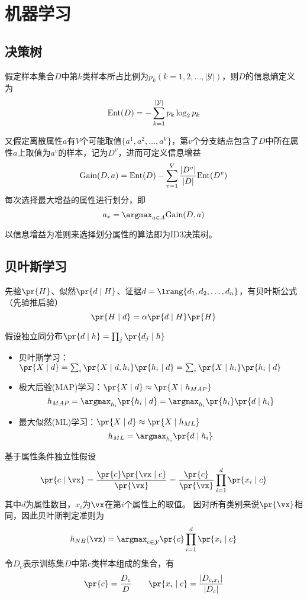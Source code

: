 
\section{机器学习}

\subsection{决策树}
假定样本集合$D$中第$k$类样本所占比例为$p_k(k=1,2,\ldots,|\mathcal{Y}|)$，则$D$的信息熵定义为
\[\mathrm{Ent}(D)=-\sum_{k=1}^{|\mathcal{Y}|}p_k\log_2 p_k\]

又假定离散属性$a$有$V$个可能取值$\{a^1,a^2,\ldots,a^V\}$，第$v$个分支结点包含了$D$中所在属性$a$上取值为$a^v$的样本，记为$D^v$，进而可定义信息增益
\[\mathrm{Gain}(D,a)=\mathrm{Ent}(D)-\sum_{v=1}^V\frac{|D^v|}{|D|}\mathrm{Ent}(D^v)\]
每次选择最大增益的属性进行划分，即
\[a_*=\argmax_{a\in A}\mathrm{Gain}(D,a)\]

以信息增益为准则来选择划分属性的算法即为ID3决策树。

\subsection{贝叶斯学习}
先验$\pr{H}$、似然$\pr{d\mid H}$、证据$d=\lrang{d_1,d_2,\ldots,d_n}$，有贝叶斯公式（先验推后验）
\[\pr{H\mid d}=\alpha\pr{d\mid H}\pr{H}\]

假设独立同分布$\pr{d\mid h}=\prod_j\pr{d_j\mid h}$
\begin{itemize}
	\item 贝叶斯学习：$\pr{X\mid d}=\sum_i\pr{X\mid d,h_i}\pr{h_i\mid d}=\sum_i\pr{X\mid h_i}\pr{h_i\mid d}$
	\item 极大后验(MAP)学习：$\pr{X\mid d}\approx\pr{X\mid h_{MAP}}$
	\[h_{MAP}=\argmax_{h_i}\pr{h_i\mid d}=\argmax_{h_i}\pr{h_i}\pr{d\mid h_i}\]
	\item 最大似然(ML)学习：$\pr{X\mid d}\approx\pr{X\mid h_{ML}}$
	\[h_{ML}=\argmax_{h_i}\pr{d\mid h_i}\]
\end{itemize}

基于属性条件独立性假设
\[\pr{c\mid\vx}=\frac{\pr{c}\pr{\vx\mid c}}{\pr{\vx}}=\frac{\pr{c}}{\pr{\vx}}\prod_{i=1}^d\pr{x_i\mid c}\]
其中$d$为属性数目，$x_i$为$\vx$在第$i$个属性上的取值。
因对所有类别来说$\pr{\vx}$相同，因此贝叶斯判定准则为
\[h_{NB}(\vx)=\argmax_{c\in\mathcal{Y}}\pr{c}\prod_{i=1}^d\pr{x_i\mid c}\]
令$D_c$表示训练集$D$中第$c$类样本组成的集合，有
\[\pr{c}=\frac{D_c}{D}\qquad\pr{x_i\mid c}=\frac{|D_{c,x_i}|}{|D_c|}\]

